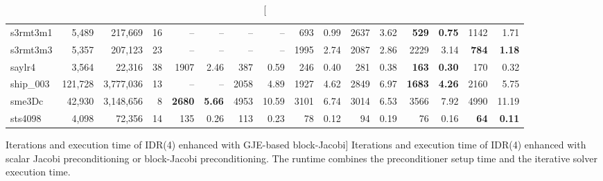 \begin{landscape}
\begin{table}[p]
\begin{tabular}{lrrr||rr|rr|rr|rr|rr|rr}
              s3rmt3m1  &  5,489  &  217,669  &  16  &       --  &       --   
              &       --  &       --   &      693 &     0.99  &     2637 &     
              3.62  & \textbf{     529} & \textbf{    0.75}  &     1142 &     
              1.71\\
              s3rmt3m3  &  5,357  &  207,123  &  23  &       --  &       --   
              &       --  &       --   &     1995 &     2.74  &     2087 &     
              2.86  &     2229 &     3.14  & \textbf{     784} & \textbf{    
              1.18}\\
                saylr4  &  3,564  &  22,316  &  38  &     1907 &     2.46  
                &      387 &     0.59  &      246 &     0.40  &      281 &     
                0.38  & \textbf{     163} & \textbf{    0.30}  &      170 &     
                0.32\\
              ship\_003  &  121,728  &  3,777,036  &  13  &       --  &       
              --   &     2058 &     4.89  &     1927 &     4.62  &     2849 
              &     6.97  & \textbf{    1683} & \textbf{    4.26}  &     2160 
              &     5.75\\
                sme3Dc  &  42,930  &  3,148,656  &  8  & \textbf{    2680} & 
                \textbf{    5.66}  &     4953 &    10.59  &     3101 &     
                6.74  &     3014 &     6.53  &     3566 &     7.92  &     4990 
                &    11.19\\
               sts4098  &  4,098  &  72,356  &  14  &      135 &     0.26  
               &      113 &     0.23  &       78 &     0.12  &       94 &     
               0.19  &       76 &     0.16  & \textbf{      64} & \textbf{    
               0.11}\\
\hline
\hline
\end{tabular}

\captionsetup{width=\textwidth}
\caption
[Iterations and execution time of IDR(4) enhanced with GJE-based block-Jacobi]
{Iterations and execution time of IDR(4) enhanced with scalar Jacobi
preconditioning or block-Jacobi preconditioning.
The runtime combines the preconditioner setup time and the iterative solver execution time.
}
\label{2017-gje-block-jacobi:tab:idr4comparison}
\end{table}

\end{landscape}
